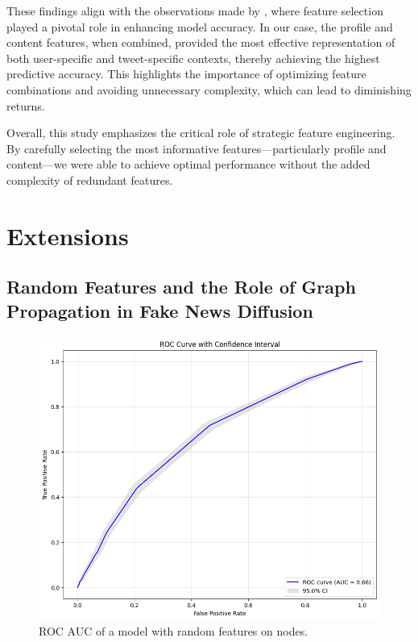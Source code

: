 \documentclass[sigconf,nonacm]{acmart}
\begin{document}
These findings align with the observations made by \cite{monti2019fakenewsdetectionsocial}, where feature selection played a pivotal role in enhancing model accuracy. In our case, the profile and content features, when combined, provided the most effective representation of both user-specific and tweet-specific contexts, thereby achieving the highest predictive accuracy. This highlights the importance of optimizing feature combinations and avoiding unnecessary complexity, which can lead to diminishing returns. 

Overall, this study emphasizes the critical role of strategic feature engineering. By carefully selecting the most informative features—particularly profile and content—we were able to achieve optimal performance without the added complexity of redundant features.

\section{Extensions}

\subsection{Random Features and the Role of Graph Propagation in Fake News Diffusion}

\begin{figure}
    \centering
    \includegraphics[scale=0.35]{roc_random.png}
    \caption{ROC AUC of a model with random features on nodes.}
    \label{fig:roc_random}
\end{figure}
\end{document}
